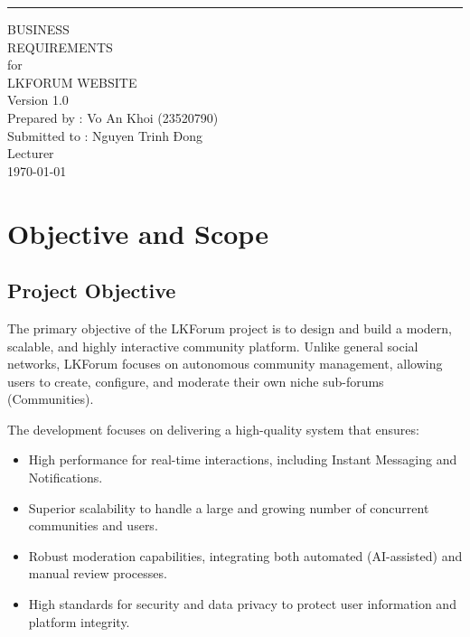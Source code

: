 \documentclass{scrreprt}
\date{}
\def\myversion{1.0 }
\begin{document}
\begin{flushright}
    \rule{16cm}{5pt}\vskip1cm
    \begin{bfseries}
        \Huge{BUSINESS\\ REQUIREMENTS}\\
        \vspace{1.5cm}
        for\\
        \vspace{1.5cm}
        LKFORUM WEBSITE\\
        \vspace{1.5cm}
        \LARGE{Version \myversion}\\
        \vspace{1.5cm}
        Prepared by : Vo An Khoi (23520790)\\
        \vspace{1.5cm}
        Submitted to : Nguyen Trinh Đong \\Lecturer\\
        \vspace{1.5cm}
        \today\\
    \end{bfseries}
\end{flushright}

\tableofcontents

\chapter{Objective and Scope}

\section{Project Objective}
The primary objective of the LKForum project is to design and build a modern, scalable, and highly interactive community platform. Unlike general social networks, LKForum focuses on autonomous community management, allowing users to create, configure, and moderate their own niche sub-forums (Communities).

The development focuses on delivering a high-quality system that ensures:
\begin{itemize}
    \item High performance for real-time interactions, including Instant Messaging and Notifications.
    \item Superior scalability to handle a large and growing number of concurrent communities and users.
    \item Robust moderation capabilities, integrating both automated (AI-assisted) and manual review processes.
    \item High standards for security and data privacy to protect user information and platform integrity.
\end{itemize}
\end{document}
